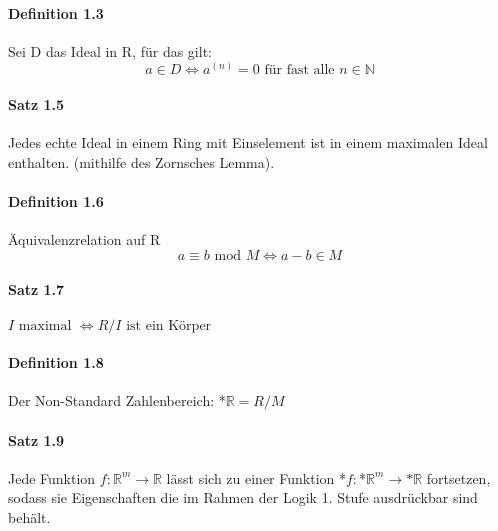 \documentclass[a4paper]{article}
\begin{document}
\paragraph{Definition 1.3} Sei D das Ideal in R, für das gilt:  
      $$ a \in D \iff a^{(n)} = 0 \text{ für fast alle } n \in \mathbb{N}  $$


\paragraph{Satz 1.5} Jedes echte Ideal in einem Ring mit Einselement ist in einem maximalen Ideal enthalten. (mithilfe des Zornsches Lemma).


\paragraph{Definition 1.6} Äquivalenzrelation auf R  %
$$ a \equiv b \text{ mod } M \iff a - b \in M $$

\paragraph{Satz 1.7} $ I \text{ maximal } \iff R/I  \text{ ist ein Körper} $

\paragraph{Definition 1.8}  Der Non-Standard Zahlenbereich: *$\mathbb{R} = R/M $

\paragraph{Satz 1.9} 
Jede Funktion $f:\mathbb{R}^m \to \mathbb{R} $ lässt sich zu einer 
Funktion *$f:$*$\mathbb{R}^m \to \text{*}\mathbb{R}$ fortsetzen, sodass sie Eigenschaften die im Rahmen 
der Logik 1. Stufe ausdrückbar sind behält.
\end{document}
